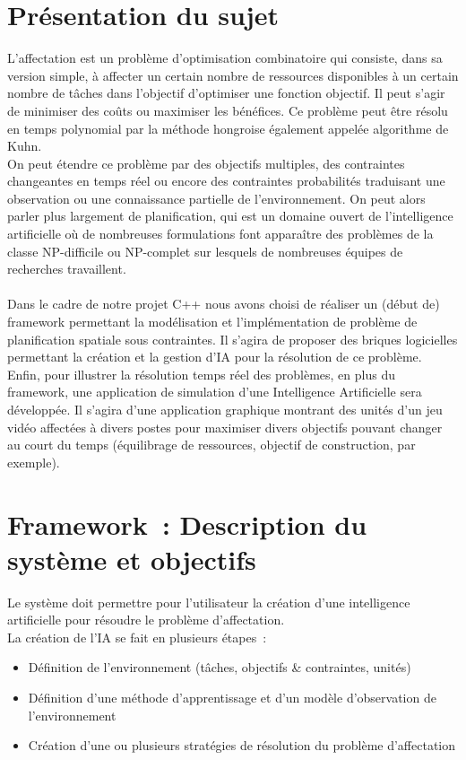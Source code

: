
\section{Présentation du sujet}
L'affectation est un problème d’optimisation combinatoire qui consiste, dans sa version simple, à affecter un certain nombre de ressources disponibles à un certain nombre de tâches dans l'objectif d'optimiser une fonction objectif. Il peut s'agir de minimiser des coûts ou maximiser les bénéfices. Ce problème peut être résolu en temps polynomial par la méthode hongroise également appelée algorithme de Kuhn.\\
On peut étendre ce problème par des objectifs multiples, des contraintes changeantes en temps réel ou encore des contraintes probabilités traduisant une observation ou une connaissance partielle de l'environnement. On peut alors parler plus largement de planification, qui est un domaine ouvert de l'intelligence artificielle où de nombreuses formulations font apparaître des problèmes de la classe NP-difficile ou NP-complet sur lesquels de nombreuses équipes de recherches travaillent.\\\\

Dans le cadre de notre projet C++ nous avons choisi de réaliser un (début de) framework permettant la modélisation et l'implémentation de problème de planification spatiale sous contraintes. Il s'agira de proposer des briques logicielles permettant la création et la gestion d'IA pour la résolution de ce problème.\\
Enfin, pour illustrer la résolution temps réel des problèmes, en plus du framework, une application de simulation d'une Intelligence Artificielle sera développée. Il s'agira d'une application graphique montrant des unités d'un jeu vidéo affectées à divers postes pour maximiser divers objectifs pouvant changer au court du temps (équilibrage de ressources, objectif de construction, par exemple).

\section{Framework~: Description du système et objectifs}

Le système doit permettre pour l'utilisateur la création d'une intelligence artificielle pour résoudre le problème d'affectation.\\
La création de l'IA se fait en plusieurs étapes~:
\begin{itemize}
\item Définition de l'environnement (tâches, objectifs \& contraintes, unités)
\item Définition d'une méthode d'apprentissage et d'un modèle d'observation de l'environnement
\item Création d'une ou plusieurs stratégies de résolution du problème d'affectation\\
\end{itemize}

